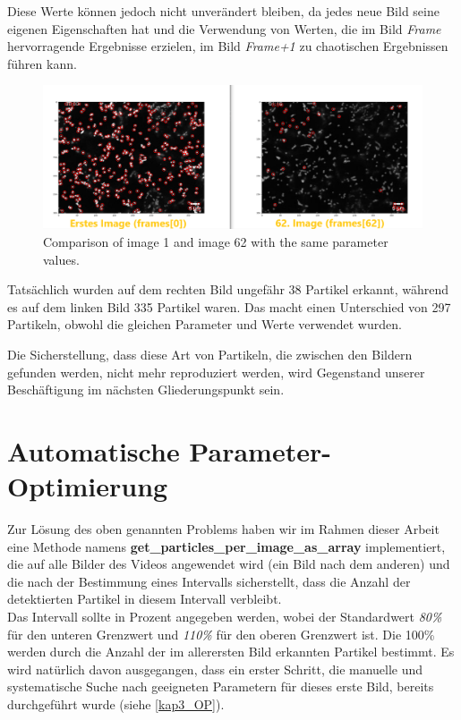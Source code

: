 Diese Werte können jedoch nicht unverändert bleiben, da jedes neue Bild seine eigenen Eigenschaften hat und die Verwendung von Werten, die im Bild \textit{Frame} hervorragende Ergebnisse erzielen, im Bild \textit{Frame+1} zu chaotischen Ergebnissen führen kann.

\begin{figure}[H]
    \centering
    \includegraphics[scale=0.37]{Grafiken/trackpyBilder/comparison_0_Vs_62.png}
    \caption{Comparison of image 1 and image 62 with the same parameter values.}
\end{figure}

Tatsächlich wurden auf dem rechten Bild ungefähr 38 Partikel erkannt, während es auf dem linken Bild 335 Partikel waren. Das macht einen Unterschied von 297 Partikeln, obwohl die gleichen Parameter und Werte verwendet wurden.

Die Sicherstellung, dass diese Art von Partikeln, die zwischen den Bildern gefunden werden, nicht mehr reproduziert werden, wird Gegenstand unserer Beschäftigung im nächsten Gliederungspunkt sein.

\section{Automatische Parameter-Optimierung}
Zur Lösung des oben genannten Problems haben wir im Rahmen dieser Arbeit eine Methode namens \textbf{get\_particles\_per\_image\_as\_array} implementiert, die auf alle Bilder des Videos angewendet wird (ein Bild nach dem anderen) und die nach der Bestimmung eines Intervalls sicherstellt, dass die Anzahl der detektierten Partikel in diesem Intervall verbleibt.\\
Das Intervall sollte in Prozent angegeben werden, wobei der Standardwert \textit{80\%} für den unteren Grenzwert und\textit{ 110\%} für den oberen Grenzwert ist. Die 100\% werden durch die Anzahl der im allerersten Bild erkannten Partikel bestimmt. 
Es wird natürlich davon ausgegangen, dass ein erster Schritt, die manuelle und systematische Suche nach geeigneten Parametern für dieses erste Bild, bereits durchgeführt wurde (siehe \ref{kap3_OP}).

